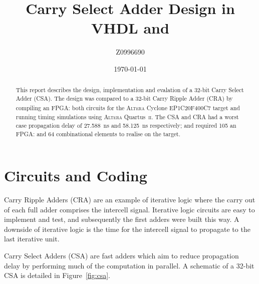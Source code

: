 \documentclass[a4paper,11pt]{article}
\title{Carry Select Adder Design in VHDL and \Altera \QuartusII}
\author{Z0996690}
\date{\today}
\newcommand{\Altera}{\textsc{Altera}\textsuperscript{\textregistered}\xspace}
\newcommand{\QuartusII}{Quartus~\textsc{ii}\xspace}
\begin{document}
\begin{@twocolumnfalse} \centering
    \renewcommand{\abstractname}{\large Abstract}
    \begin{abstract}
        This report describes the design, implementation and evalation of a 32-bit Carry Select Adder (CSA). The design was compared to a 32-bit Carry Ripple Adder (CRA) by compiling an FPGA: both circuits for the \Altera Cyclone EP1C20F400C7 target and running timing simulations using \Altera \QuartusII. The CSA and CRA had a worst case propagation delay of \SI{27.588}{\ns} and \SI{58.125}{\ns} respectively; and required 105 an FPGA: and 64 combinational elements to realise on the target.
    \end{abstract}
\end{@twocolumnfalse}

\section{Circuits and Coding}

Carry Ripple Adders (CRA) are an example of iterative logic where the carry out of each full adder comprises the intercell signal. Iterative logic circuits are easy to implement and test, and subsequently the first adders were built this way. A downside of iterative logic is the time for the intercell signal to propagate to the last iterative unit.

Carry Select Adders (CSA) are fast adders which aim to reduce propagation delay by performing much of the computation in parallel. A schematic of a 32-bit CSA is detailed in Figure~\ref{fig:csa}.
\end{document}
